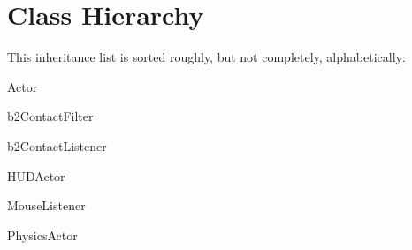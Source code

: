\section{Class Hierarchy}
This inheritance list is sorted roughly, but not completely, alphabetically\-:\begin{DoxyCompactList}
\item Actor\begin{DoxyCompactList}
\item {}
\end{DoxyCompactList}
\item b2\-Contact\-Filter\begin{DoxyCompactList}
\item {}
\end{DoxyCompactList}
\item b2\-Contact\-Listener\begin{DoxyCompactList}
\item {}
\end{DoxyCompactList}
\item {}
\item {}
\item H\-U\-D\-Actor\begin{DoxyCompactList}
\item {}
\end{DoxyCompactList}
\item {}
\item {}
\item {}
\item {}
\item Mouse\-Listener\begin{DoxyCompactList}
\item {}
\end{DoxyCompactList}
\item Physics\-Actor\begin{DoxyCompactList}
\item {}

\end{DoxyCompactList}
\end{DoxyCompactList}
